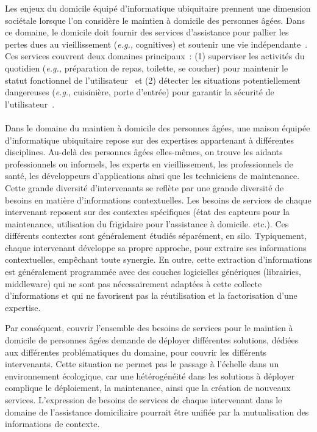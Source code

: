 Les enjeux du domicile équipé d’informatique ubiquitaire prennent une dimension 
sociétale lorsque l’on considère le maintien à domicile des personnes âgées. 
Dans ce domaine, le domicile doit fournir des services d’assistance pour 
pallier les pertes dues au vieillissement ({\em e.g.,} cognitives) et soutenir 
une vie indépendante~. Ces services couvrent deux 
domaines principaux~: (1) superviser les activités du quotidien ({\em e.g.,} 
préparation de repas, toilette, se coucher) pour maintenir le statut fonctionnel 
de l'utilisateur~ et (2) détecter 
les situations potentiellement dangereuses ({\em e.g.,} cuisinière, porte 
d'entrée) pour garantir la sécurité de l'utilisateur~. 
\paragraph{}
Dans le domaine du maintien à domicile des personnes âgées, une maison équipée 
d’informatique ubiquitaire repose sur des expertises appartenant à différentes 
disciplines. Au-delà des personnes âgées elles-mêmes, on trouve les aidants 
professionnels ou informels, les experts en vieillissement, les professionnels 
de santé, les développeurs d'applications ainsi que les techniciens de 
maintenance. Cette grande diversité d’intervenants se reflète par une grande 
diversité de besoins en matière d’informations contextuelles. Les besoins de 
services de chaque intervenant reposent sur des contextes spécifiques (état des 
capteurs pour la maintenance, utilisation du frigidaire pour l’assistance à 
domicile. etc.). Ces différents contextes sont généralement étudiés séparément, en 
silo. Typiquement, chaque intervenant développe sa propre approche, pour 
extraire ses informations contextuelles, empêchant toute synergie. En outre, 
cette extraction d’informations est généralement programmée avec des couches 
logicielles génériques (librairies, middleware) qui ne sont pas nécessairement 
adaptées à cette collecte d’informations et qui ne favorisent pas la 
réutilisation et la factorisation d’une expertise.

Par conséquent, couvrir l'ensemble des besoins de services pour le maintien à domicile de personnes âgées demande de déployer différentes solutions, dédiées aux différentes problématiques du domaine, pour couvrir les différents intervenants. Cette situation ne permet pas le passage à l'échelle dans un environnement écologique, car une hétérogénéité dans les solutions à déployer complique le déploiement, la maintenance, ainsi que la création de nouveaux services.  L'expression de besoins de services de chaque intervenant dans le domaine de l'assistance domiciliaire pourrait être unifiée par la mutualisation des informations de contexte.

